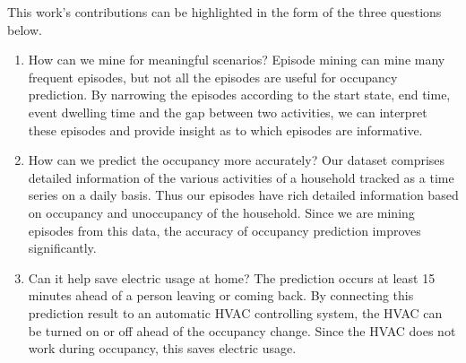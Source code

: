 This work's contributions can be highlighted in the form of the three questions below. 
\begin{enumerate}
\item How can we mine for meaningful scenarios? 
Episode mining can mine many frequent episodes, but not all the episodes are useful 
for occupancy prediction. 
By narrowing the episodes according to the start state, 
end time, event dwelling time and the gap between two activities, 
we can interpret these episodes and provide insight as to 
which episodes are informative. 
\item How can we predict the occupancy more accurately?
Our dataset comprises detailed information of the various activities of a household 
tracked as a time series on a daily basis. 
Thus our episodes have rich detailed information based on occupancy and 
unoccupancy of the household. 
Since we are mining episodes from this data, 
the accuracy of occupancy prediction improves significantly. 
\item  Can it help save electric usage at home?
The prediction occurs at least 15 minutes ahead of a person 
leaving or coming back. 
By connecting this prediction result to an automatic HVAC controlling system, the HVAC can be turned on or off  ahead of the occupancy change. 
Since the HVAC does not work during occupancy, 
this saves electric usage. 
\end{enumerate}

\iffalse
Next, 
we first discuss the time-gap constraint episode mining 
model and the mixture model, 
and how to predict the target event in section 4. 
Then, 
in section 5 we will show 
the experimental results. 
\fi









